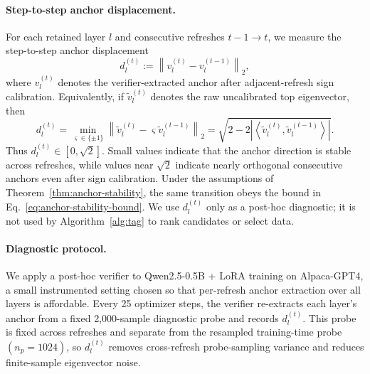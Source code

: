 \paragraph{Step-to-step anchor displacement.}
For each retained layer \(l\) and consecutive refreshes
\(t-1\!\to\!t\), we measure the step-to-step anchor displacement
\begin{equation}
  d_l^{(t)}
  :=
  \left\|
  v_l^{(t)}-v_l^{(t-1)}
  \right\|_2 ,
  \label{eq:dstep}
\end{equation}
where \(v_l^{(t)}\) denotes the verifier-extracted anchor after
adjacent-refresh sign calibration. Equivalently, if
\(\tilde v_l^{(t)}\) denotes the raw uncalibrated top eigenvector, then
\begin{equation}
  d_l^{(t)}
  =
  \min_{\varsigma\in\{\pm1\}}
  \left\|
  \tilde v_l^{(t)}
  -
  \varsigma \tilde v_l^{(t-1)}
  \right\|_2
  =
  \sqrt{
  2
  -
  2
  \left|
  \left\langle
  \tilde v_l^{(t)},\tilde v_l^{(t-1)}
  \right\rangle
  \right|
  } .
  \label{eq:dstep-sign-invariant}
\end{equation}
Thus \(d_l^{(t)}\in[0,\sqrt{2}]\). Small values indicate that the
anchor direction is stable across refreshes, while values near
\(\sqrt{2}\) indicate nearly orthogonal consecutive anchors even
after sign calibration. Under the assumptions of
Theorem~\ref{thm:anchor-stability}, the same transition obeys the
bound in Eq.~\eqref{eq:anchor-stability-bound}. We use
\(d_l^{(t)}\) only as a post-hoc diagnostic; it is not used by
Algorithm~\ref{alg:tag} to rank candidates or select data.

\paragraph{Diagnostic protocol.}
We apply a post-hoc verifier to Qwen2.5-0.5B + LoRA training on
Alpaca-GPT4, a small instrumented setting chosen so that per-refresh
anchor extraction over all layers is affordable. Every 25 optimizer
steps, the verifier re-extracts each layer's anchor from a fixed
2,000-sample diagnostic probe and records \(d_l^{(t)}\). This probe
is fixed across refreshes and separate from the resampled
training-time probe \((n_p=1024)\), so \(d_l^{(t)}\)
removes cross-refresh probe-sampling variance and reduces finite-sample
eigenvector noise.

